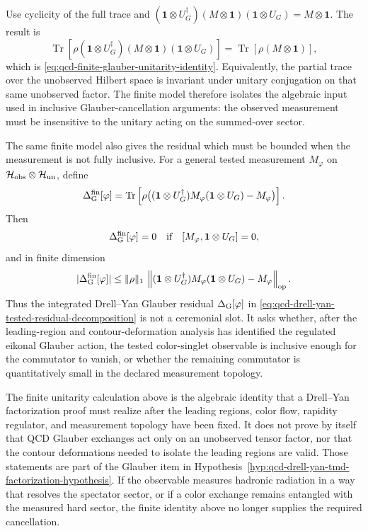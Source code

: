 Use cyclicity of the full trace and
\((\mathbf1\otimes U_G^\dagger)(M\otimes\mathbf1)(\mathbf1\otimes U_G)
=M\otimes\mathbf1\).  The result is
\[
  \operatorname{Tr}
  \left[
    \rho
    (\mathbf1\otimes U_G^\dagger)(M\otimes\mathbf1)(\mathbf1\otimes U_G)
  \right]
  =
  \operatorname{Tr}\left[\rho(M\otimes\mathbf1)\right],
\]
which is
\eqref{eq:qcd-finite-glauber-unitarity-identity}.
Equivalently, the partial trace over the unobserved Hilbert space is invariant
under unitary conjugation on that same unobserved factor.  The finite model
therefore isolates the algebraic input used in inclusive Glauber-cancellation
arguments: the observed measurement must be insensitive to the unitary acting
on the summed-over sector.

The same finite model also gives the residual which must be bounded when the
measurement is not fully inclusive.  For a general tested measurement
\(M_\varphi\) on
\(\mathcal H_{\rm obs}\otimes\mathcal H_{\rm un}\), define
\begin{equation}
  \Delta_{\rm G}^{\rm fin}[\varphi]
  =
  \operatorname{Tr}
  \left[
    \rho
    \bigl(
      (\mathbf1\otimes U_G^\dagger)
      M_\varphi
      (\mathbf1\otimes U_G)
      -
      M_\varphi
    \bigr)
  \right].
  \label{eq:qcd-finite-glauber-resolved-measurement-residual}
\end{equation}
Then
\[
  \Delta_{\rm G}^{\rm fin}[\varphi]=0
  \quad\hbox{if}\quad
  [M_\varphi,\mathbf1\otimes U_G]=0,
\]
and in finite dimension
\begin{equation}
  |\Delta_{\rm G}^{\rm fin}[\varphi]|
  \leq
  \|\rho\|_1\,
  \left\|
      (\mathbf1\otimes U_G^\dagger)
      M_\varphi
      (\mathbf1\otimes U_G)
      -
      M_\varphi
  \right\|_{\rm op}.
  \label{eq:qcd-finite-glauber-resolved-measurement-bound}
\end{equation}
Thus the integrated Drell--Yan Glauber residual
\(\Delta_{\rm G}[\varphi]\) in
\eqref{eq:qcd-drell-yan-tested-residual-decomposition} is not a ceremonial
slot.  It asks whether, after the leading-region and contour-deformation
analysis has identified the regulated eikonal Glauber action, the tested
color-singlet observable is inclusive enough for the commutator to vanish, or
whether the remaining commutator is quantitatively small in the declared
measurement topology.

\begin{remark}
\label{ca:qcd-glauber-cancellation-status}
The finite unitarity calculation above is the algebraic identity that a
Drell--Yan factorization proof must realize after the leading regions, color
flow, rapidity regulator, and measurement topology have been fixed.  It does
not prove by itself that QCD Glauber exchanges act only on an unobserved
tensor factor, nor that the contour deformations needed to isolate the
leading regions are valid.  Those statements are part of the
Glauber item in Hypothesis~\ref{hyp:qcd-drell-yan-tmd-factorization-hypothesis}.  If the
observable measures hadronic radiation in a way that resolves the spectator
sector, or if a color exchange remains entangled with the measured hard
sector, the finite identity above no longer supplies the required
cancellation.
\end{remark}

